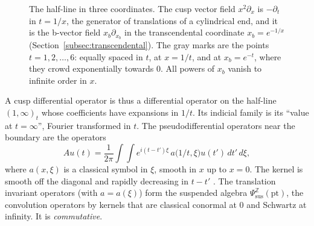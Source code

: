 \documentclass[11pt,oneside,reqno]{article}
\newcommand{\Z}{\mathbb Z}
\newcommand{\Psis}{\Psi_{\mathrm{sus}}}
\theoremstyle{plain}
\theoremstyle{definition}
\theoremstyle{remark}
\begin{document}
\begin{figure}[htbp]
\centering
{}
\caption[The half-line in three coordinates]{The half-line in three
coordinates. The cusp vector field \(x^2\partial_x\) is \(-\partial_t\) in
\(t=1/x\), the generator of translations of a cylindrical end, and it is
the b-vector field \(x_b\partial_{x_b}\) in the transcendental coordinate
\(x_b=e^{-1/x}\) (Section~\ref{subsec:transcendental}). The gray marks
are the points \(t=1,2,\dots,6\): equally spaced in \(t\), at
\(x=1/t\), and at \(x_b=e^{-t}\), where they crowd exponentially towards
\(0\). All powers of \(x_b\) vanish to infinite order in \(x\).}
\label{fig:halfline}
\end{figure}

A cusp differential operator is thus a differential operator on the
half-line \((1,\infty)_t\) whose coefficients have expansions in \(1/t\).
Its indicial family is its ``value at \(t=\infty\)'', Fourier transformed
in \(t\). The pseudodifferential operators near the boundary are the
operators
\[
 Au(t)=\frac1{2\pi}\int\!\!\int e^{i(t-t')\xi}\,a\bigl(1/t,\xi\bigr)
 u(t')\,dt'\,d\xi,
\]
where \(a(x,\xi)\) is a classical symbol in \(\xi\), smooth in \(x\) up to
\(x=0\). The kernel is smooth off the diagonal and rapidly decreasing in
\(t-t'\) \cite[Props.~22, 23]{MN}. The translation invariant operators
(with \(a=a(\xi)\)) form the suspended algebra \(\Psis^{\Z}(\mathrm{pt})\),
the convolution operators by kernels that are classical conormal at
\(0\) and Schwartz at infinity. It is \emph{commutative}.
\end{document}
